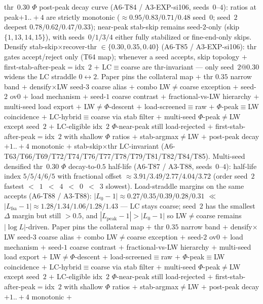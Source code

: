 \documentclass[11pt]{article}
\begin{document}
thr~$0.30$ $\Phi$ post-peak decay curve (A6-T84 / A3-EXP-si106,
seeds~$0$--$4$): ratios at peak${+}1..{+}4$ are strictly monotonic
($\approx 0.95/0.83/0.71/0.48$ seed~$0$; seed~$2$ deepest
$0.78/0.62/0.47/0.33$); near-peak stab-skip remains seed-$2$-only
(skip $\{1,13,14,15\}$), with seeds~$0/1/3/4$ either fully stabilized or
fine-end-only skips. Densify stab-skip$\times$recover-thr
$\in\{0.30,0.35,0.40\}$ (A6-T85 / A3-EXP-si106): thr gates accept/reject
only (T64 map); whenever a seed accepts, skip topology $+$
first-stab-after-peak${=}$idx~$2$ $+$ LC$\equiv$coarse are
thr-invariant --- only seed~$2$@$0.30$ widens the LC straddle
$0\leftrightarrow 2$. Paper pins the collateral map $+$ thr $0.35$
narrow band $+$ densify$\times$LW seed-$3$ coarse alias $+$ combo
LW$\neq$coarse exception $+$ seed-$2$ ov$0$ $+$ load mechanism $+$
seed-$1$ coarse contrast $+$ fractional-vs-LW hierarchy $+$ multi-seed
load export $+$ LW$\neq\Phi$-descent $+$ load-screened$\equiv$raw $+$
$\Phi$-peak$\equiv$LW coincidence $+$ LC-hybrid$\equiv$coarse via stab
filter $+$ multi-seed $\Phi$-peak$\neq$LW except seed~$2$ $+$
LC-eligible idx~$2$ $\Phi$-near-peak still load-rejected $+$
first-stab-after-peak${=}$idx~$2$ with shallow $\Phi$ ratios $+$
stab-argmax$\neq$LW $+$ post-peak decay ${+}1..{+}4$ monotonic $+$
stab-skip$\times$thr LC-invariant
(A6-T63/T66/T69/T72/T74/T76/T77/T78/T79/T81/T82/T84/T85). Multi-seed
densified thr~$0.30$ $\Phi$ decay-to-$0.5$ half-life (A6-T87 / A3-T88,
seeds~$0$--$4$): half-life index $5/5/4/6/5$ with fractional offset
$\approx 3.91/3.49/2.77/4.04/3.72$ (order seed~$2$ fastest $<$~$1$~$<$~$4$~$<$~$0$~$<$~$3$
slowest). Load-straddle margins on the same accepts (A6-T88 / A3-T88):
$|L_0{-}1|\approx 0.27/0.35/0.39/0.28/0.31$ $\ll$
$|L_{\mathrm{fsa}}{-}1|\approx 1.28/1.34/1.06/1.28/1.43$ --- LC stays
coarse; seed~$2$ has the smallest $\Delta$ margin but still $>0.5$, and
$|L_{\mathrm{peak}}{-}1|>|L_0{-}1|$ so LW$\neq$coarse remains
$|\log L|$-driven. Paper pins the collateral map $+$ thr $0.35$ narrow
band $+$ densify$\times$LW seed-$3$ coarse alias $+$ combo LW$\neq$coarse
exception $+$ seed-$2$ ov$0$ $+$ load mechanism $+$ seed-$1$ coarse
contrast $+$ fractional-vs-LW hierarchy $+$ multi-seed load export $+$
LW$\neq\Phi$-descent $+$ load-screened$\equiv$raw $+$
$\Phi$-peak$\equiv$LW coincidence $+$ LC-hybrid$\equiv$coarse via stab
filter $+$ multi-seed $\Phi$-peak$\neq$LW except seed~$2$ $+$
LC-eligible idx~$2$ $\Phi$-near-peak still load-rejected $+$
first-stab-after-peak${=}$idx~$2$ with shallow $\Phi$ ratios $+$
stab-argmax$\neq$LW $+$ post-peak decay ${+}1..{+}4$ monotonic $+$
\end{document}
